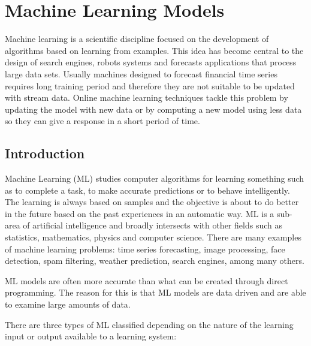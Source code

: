 \chapter{Machine Learning Models}
Machine learning is a scientific discipline focused on the development of
algorithms based on learning from examples. This idea has become central to the
design of search engines, robots systems and forecasts applications that
process large data sets. Usually machines designed to forecast financial time
series requires long training period and therefore they are not suitable to be updated
with stream data. Online machine learning techniques tackle this problem by updating the model with new
data or by computing a new model using less data so they can give a response in a
short period of time.

\vspace{0.5cm} 

\section{Introduction}
Machine Learning (ML) studies computer algorithms for learning
something such as to complete a task, to make accurate predictions or to behave intelligently. The learning is always based on samples and the objective is about to do better in the future based on the past experiences in an automatic way. ML is a sub-area of artificial intelligence and broadly intersects with other fields such as statistics, mathematics, physics and computer science. 
There are many examples of machine learning problems: time series forecasting, image processing, face detection, spam filtering, weather prediction, search engines, among many others.

ML models are often more accurate than what can be created through direct programming. The reason for this is that ML models are data driven and are able to examine large amounts of data.

There are three types of ML classified depending on the nature of the learning input or output available to a learning system:


